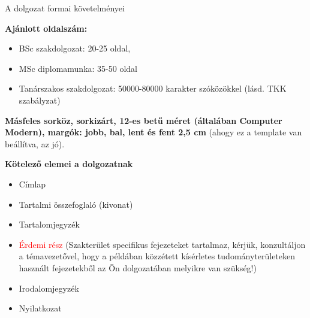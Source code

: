 \documentclass[a4paper,12pt]{report}
\date{today}
\theoremstyle{definition}
\theoremstyle{remark}
\begin{document}
\thispagestyle{empty}

\begin{center}
 {\Large A dolgozat formai követelményei}   
\end{center}
 
\vspace{1 cm}

{\bf Ajánlott oldalszám:}
\begin{itemize}
\item BSc szakdolgozat: 20-25 oldal, 
\item MSc diplomamunka: 35-50 oldal
\item Tanárszakos szakdolgozat: 50000-80000 karakter szóközökkel (lásd. TKK szabályzat)
\end{itemize}

\vspace{1 cm}

{\bf Másfeles sorköz, sorkizárt, 12-es betű méret (általában Computer Modern), margók: jobb, bal, lent és fent 2,5 cm} (ahogy ez a template van beállítva, az jó).

\vspace{1 cm}

{\bf Kötelező elemei a dolgozatnak}
\begin{itemize}
    \item Címlap
    \item Tartalmi összefoglaló (kivonat)
    \item Tartalomjegyzék
    \item \textcolor{red}{Érdemi rész}
(Szakterület specifikus fejezeteket tartalmaz, kérjük, konzultáljon a témavezetővel, hogy a példában közzétett kísérletes tudományterületeken használt fejezetekből az Ön dolgozatában melyikre van szükség!)
\item Irodalomjegyzék
\item Nyilatkozat
\end{itemize}
\newpage




\thispagestyle{empty}
\end{document}
